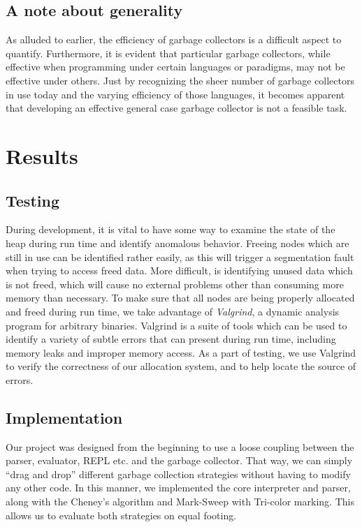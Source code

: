 \documentclass[11pt,leqno]{article}
\begin{document}
\subsection{A note about generality}
As alluded to earlier, the efficiency of garbage collectors is a difficult aspect to quantify\cite{hertz}. Furthermore, it is evident that particular garbage collectors, while effective when programming under certain languages or paradigms, may not be effective under others. Just by recognizing the sheer number of garbage collectors in use today and the varying efficiency of those languages, it becomes apparent that developing an effective general case garbage collector is not a feasible task.


\section{Results}
\subsection{Testing}
During development, it is vital to have some way to examine the state of the heap during run time and identify anomalous behavior. Freeing nodes which are still in use can be identified rather easily, as this will trigger a segmentation fault when trying to access freed data. More difficult, is identifying unused data which is not freed, which will cause no external problems other than consuming more memory than necessary. To make sure that all nodes are being properly allocated and freed during run time, we take advantage of \emph{Valgrind}, a dynamic analysis program for arbitrary binaries. Valgrind is a suite of tools which can be used to identify a variety of subtle errors that can present during run time, including memory leaks and improper memory access. As a part of testing, we use Valgrind to verify the correctness of our allocation system, and to help locate the source of errors.

\subsection{Implementation}
Our project was designed from the beginning to use a loose coupling between the parser, evaluator, REPL etc. and the garbage collector. That way, we can simply ``drag and drop'' different garbage collection strategies without having to modify any other code. In this manner, we implemented the core interpreter and parser, along with the Cheney's algorithm and Mark-Sweep with Tri-color marking. This allows us to evaluate both strategies on equal footing.
\end{document}
